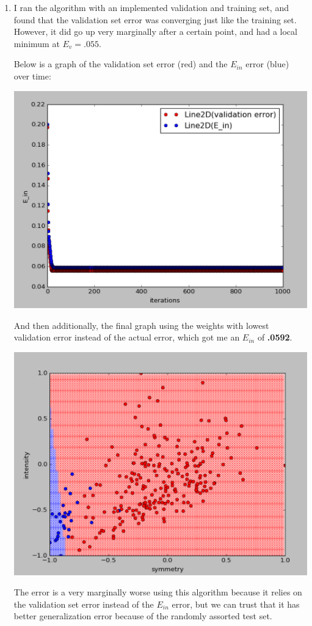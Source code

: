 \documentclass[12pt]{article}
\begin{document}
\begin{enumerate}[label=(\alph*)]
	\item I ran the algorithm with an implemented validation and training set, and found that the validation set error was converging just like the training set. However, it did go up very marginally after a certain point, and had a local minimum at $E_v = \boldsymbol{.055}$.

	Below is a graph of the validation set error (red) and the $E_{in}$ error (blue) over time:
	
	\includegraphics[scale=0.6]{2c1.png}
	
	And then additionally, the final graph using the weights with lowest validation error instead of the actual error, which got me an $E_{in}$ of \textbf{.0592}.
	
	\includegraphics[scale=0.6]{2c2.png}
	
	The error is a very marginally worse using this algorithm because it relies on the validation set error instead of the $E_{in}$ error, but we can trust that it has better generalization error because of the randomly assorted test set.
\end{enumerate}
\end{document}
